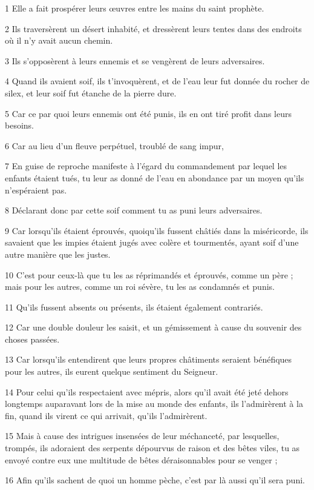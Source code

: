 \par 1 Elle a fait prospérer leurs œuvres entre les mains du saint prophète.
\par 2 Ils traversèrent un désert inhabité, et dressèrent leurs tentes dans des endroits où il n'y avait aucun chemin.
\par 3 Ils s'opposèrent à leurs ennemis et se vengèrent de leurs adversaires.
\par 4 Quand ils avaient soif, ils t'invoquèrent, et de l'eau leur fut donnée du rocher de silex, et leur soif fut étanche de la pierre dure.
\par 5 Car ce par quoi leurs ennemis ont été punis, ils en ont tiré profit dans leurs besoins.
\par 6 Car au lieu d'un fleuve perpétuel, troublé de sang impur,
\par 7 En guise de reproche manifeste à l'égard du commandement par lequel les enfants étaient tués, tu leur as donné de l'eau en abondance par un moyen qu'ils n'espéraient pas.
\par 8 Déclarant donc par cette soif comment tu as puni leurs adversaires.
\par 9 Car lorsqu'ils étaient éprouvés, quoiqu'ils fussent châtiés dans la miséricorde, ils savaient que les impies étaient jugés avec colère et tourmentés, ayant soif d'une autre manière que les justes.
\par 10 C'est pour ceux-là que tu les as réprimandés et éprouvés, comme un père ; mais pour les autres, comme un roi sévère, tu les as condamnés et punis.
\par 11 Qu'ils fussent absents ou présents, ils étaient également contrariés.
\par 12 Car une double douleur les saisit, et un gémissement à cause du souvenir des choses passées.
\par 13 Car lorsqu'ils entendirent que leurs propres châtiments seraient bénéfiques pour les autres, ils eurent quelque sentiment du Seigneur.
\par 14 Pour celui qu'ils respectaient avec mépris, alors qu'il avait été jeté dehors longtemps auparavant lors de la mise au monde des enfants, ils l'admirèrent à la fin, quand ils virent ce qui arrivait, qu'ils l'admirèrent.
\par 15 Mais à cause des intrigues insensées de leur méchanceté, par lesquelles, trompés, ils adoraient des serpents dépourvus de raison et des bêtes viles, tu as envoyé contre eux une multitude de bêtes déraisonnables pour se venger ;
\par 16 Afin qu'ils sachent de quoi un homme pèche, c'est par là aussi qu'il sera puni.
